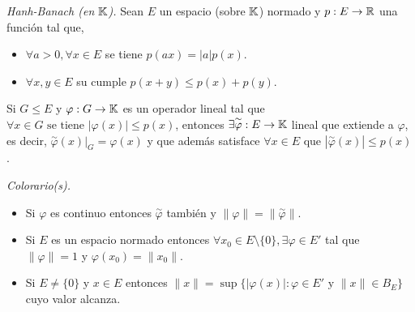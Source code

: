 \begin{theorem}
    \emph{Hanh-Banach (en \(\mathbb{K}\)).} Sean \(E\) un espacio (sobre \(\mathbb{K}\)) normado y \(p:E\to \mathbb{R}\) una función tal que, 
    \begin{itemize}
        \item \(\forall a>0,\forall x\in E\) se tiene \(p(ax) = |a|p(x)\). 
        \item \(\forall x,y\in E\) su cumple \(p(x+y) \leq p(x)+p(y)\). 
    \end{itemize} 
    Si \(G\leq E \) y \(\varphi : G \to \mathbb{K}\) es un operador lineal tal que \(\forall x\in G \text{ se tiene }|\varphi(x)|\leq p(x)\), entonces \(\exists \overset{\sim }{\varphi} : E \to \mathbb{K}\) lineal que extiende a \(\varphi\), es decir, \(\overset{\sim }{\varphi}(x)\Big|_{G} = \varphi(x) \) y que además satisface \(\forall x\in E \text{ que }|\overset{\sim}{\varphi}(x)|\leq p(x)\). 
\end{theorem}
\begin{note}
    \emph{Colorario(s).} \begin{itemize}
        \item Si \(\varphi \) es continuo entonces \(\overset{\sim}{\varphi}\) también y \(\|\varphi\| = \|\overset{\sim}{\varphi}\|\). 
        \item Si \(E\) es un espacio normado entonces \(\forall x_0\in E \setminus \{0\},\exists \varphi\in E'\) tal que \(\|\varphi\| = 1\) y \(\varphi(x_0) = \|x_0\|\). 
        \item Si \(E\neq \{0\}\) y \(x\in E \) entonces \(\|x\| = \sup\{ |\varphi(x)|: \varphi \in E' \text{ y } \|x\|\in B_E\} \) cuyo valor alcanza.   
    \end{itemize}
\end{note}

